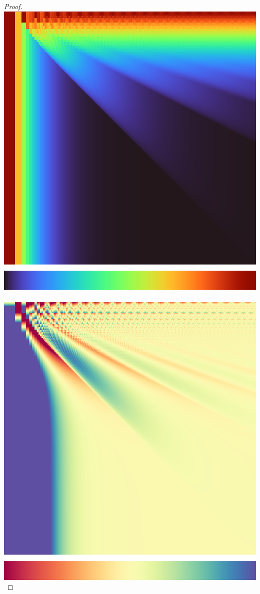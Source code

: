 \documentclass[]{article}
\begin{document}
\begin{proof}
	\includegraphics[scale=0.3]{w.png}\,\includegraphics[scale=0.3]{bias.png}
	

\end{proof}
\end{document}
